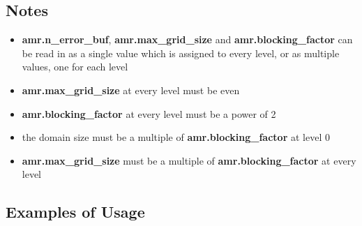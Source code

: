 \subsection{Notes}

\begin{itemize}
\item {\bf amr.n\_error\_buf}, {\bf amr.max\_grid\_size} and {\bf amr.blocking\_factor} 
can be read in as a single value which is assigned to every level, 
or as multiple values, one for each level
\item {\bf amr.max\_grid\_size} at every level must be even 
\item {\bf amr.blocking\_factor} at every level must be a power of 2
\item the domain size must be a multiple of  {\bf amr.blocking\_factor} at level 0
\item {\bf amr.max\_grid\_size} must be a multiple of {\bf amr.blocking\_factor} at every level
\end{itemize}

\subsection{Examples of Usage}

